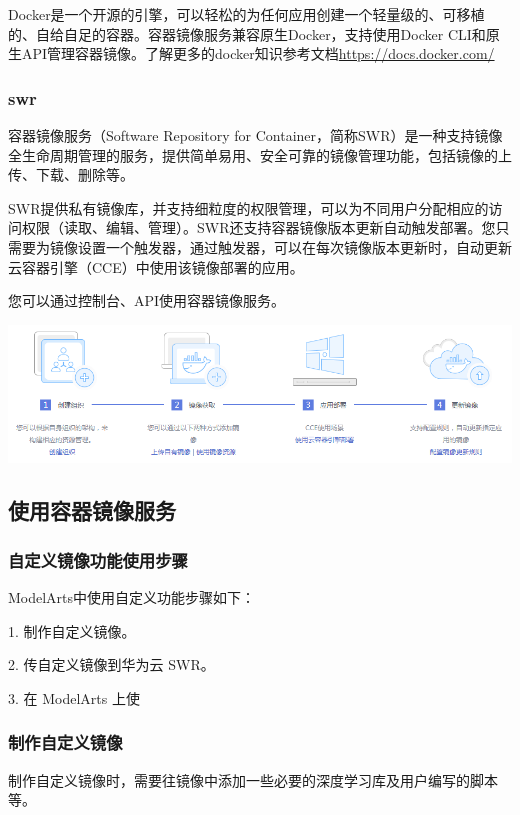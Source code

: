 \documentclass[fontset=windows,openany,UTF8]{ctexbook}
\begin{document}
Docker是一个开源的引擎，可以轻松的为任何应用创建一个轻量级的、可移植的、自给自足的容器。容器镜像服务兼容原生Docker，支持使用Docker CLI和原生API管理容器镜像。了解更多的docker知识参考文档\url{https://docs.docker.com/}

\subsubsection{swr}

容器镜像服务（Software Repository for Container，简称SWR）是一种支持镜像全生命周期管理的服务，提供简单易用、安全可靠的镜像管理功能，包括镜像的上传、下载、删除等。

SWR提供私有镜像库，并支持细粒度的权限管理，可以为不同用户分配相应的访问权限（读取、编辑、管理）。SWR还支持容器镜像版本更新自动触发部署。您只需要为镜像设置一个触发器，通过触发器，可以在每次镜像版本更新时，自动更新云容器引擎（CCE）中使用该镜像部署的应用。

您可以通过控制台、API使用容器镜像服务。

\includegraphics[scale=0.5]{./assets/swr1.png}  

\subsection{使用容器镜像服务}

\subsubsection{自定义镜像功能使用步骤}

ModelArts中使用自定义功能步骤如下：

1. 制作自定义镜像。

2. 传自定义镜像到华为云 SWR。

3. 在 ModelArts 上使

\subsubsection{制作自定义镜像}

制作自定义镜像时，需要往镜像中添加一些必要的深度学习库及用户编写的脚本等。
\end{document}
